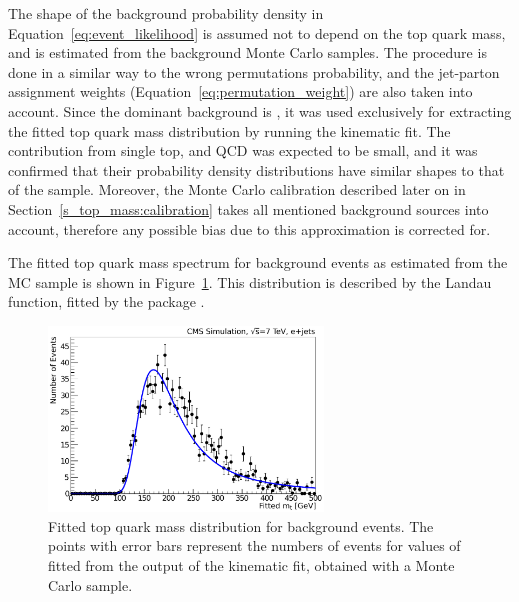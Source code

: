 The shape of the background probability density in Equation~\ref{eq:event_likelihood} is assumed not to depend on the
top quark mass, and is estimated from the background Monte Carlo samples. The procedure is done in a similar way to the
wrong permutations probability, and the jet-parton assignment weights (Equation~\ref{eq:permutation_weight}) are also
taken into account. Since the dominant background is \WpJets, it was used exclusively for extracting the fitted top
quark mass distribution by running the kinematic fit. The contribution from single top, \ZpJets and QCD was expected to
be small, and it was confirmed that their probability density distributions have similar shapes to that of the \WpJets
sample. Moreover, the Monte Carlo calibration described later on in Section~\ref{s_top_mass:calibration} takes all
mentioned background sources into account, therefore any possible bias due to this approximation is corrected for.

The fitted top quark mass spectrum for background events as estimated from the \WpJets MC sample is shown in
Figure~\ref{fig:background_wjets_fitted_top_mass}. This distribution is described by the Landau function, fitted by the
\ROOT package \autocite{Landau}.

\begin{figure}[!htpb]
	\centering
	\includegraphics[width=0.65\textwidth]{background_wjets_fitted_top_mass}
	\caption[Fitted top quark mass distribution for background events]{Fitted top quark mass distribution for background
	events. The points with error bars represent the numbers of events for values of fitted \mtop from the output of the
	kinematic fit, obtained with a \WpJets Monte Carlo sample.}
	\label{fig:background_wjets_fitted_top_mass}
\end{figure}

